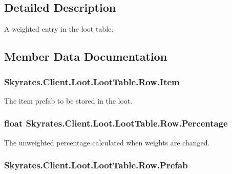 \subsection{Detailed Description}
A weighted entry in the loot table. 



\subsection{Member Data Documentation}
\hypertarget{class_skyrates_1_1_client_1_1_loot_1_1_loot_table_1_1_row_a029a405a7e04b52654cff5f0d4537ba8}{
\subsubsection[{Item}]{ Skyrates.\-Client.\-Loot.\-Loot\-Table.\-Row.\-Item}}\label{class_skyrates_1_1_client_1_1_loot_1_1_loot_table_1_1_row_a029a405a7e04b52654cff5f0d4537ba8}


The item prefab to be stored in the loot. 

\hypertarget{class_skyrates_1_1_client_1_1_loot_1_1_loot_table_1_1_row_a94033188f91d43c16658659a93df21aa}{
\subsubsection[{Percentage}]{\setlength{\rightskip}{0pt plus 5cm}float Skyrates.\-Client.\-Loot.\-Loot\-Table.\-Row.\-Percentage}}\label{class_skyrates_1_1_client_1_1_loot_1_1_loot_table_1_1_row_a94033188f91d43c16658659a93df21aa}


The unweighted percentage calculated when weights are changed. 

\hypertarget{class_skyrates_1_1_client_1_1_loot_1_1_loot_table_1_1_row_afd62822707961180e392415e5fd8cb53}{
\subsubsection[{Prefab}]{ Skyrates.\-Client.\-Loot.\-Loot\-Table.\-Row.\-Prefab}}\label{class_skyrates_1_1_client_1_1_loot_1_1_loot_table_1_1_row_afd62822707961180e392415e5fd8cb53}


